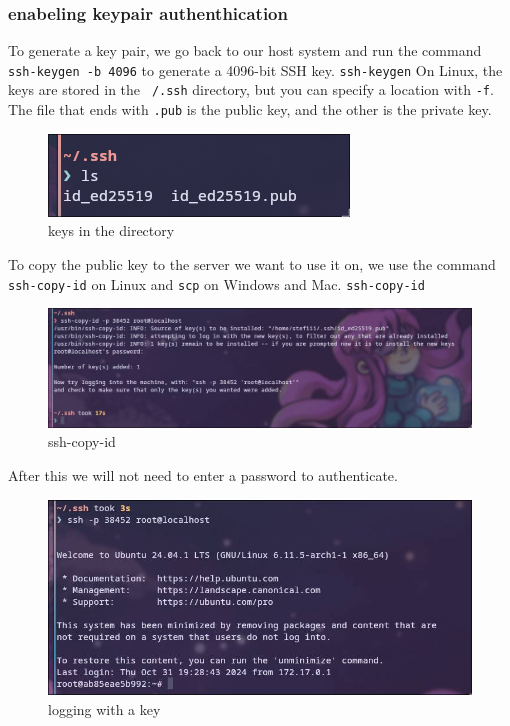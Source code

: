 \documentclass[a4paper]{article}
\newcommand{\abc}{\hfill \break}
\begin{document}
\subsubsection{enabeling keypair authenthication}
To generate a key pair, we go back to our host system and run the command \texttt{ssh-keygen -b 4096} to generate a 4096-bit SSH key. \texttt{ssh-keygen}
On Linux, the keys are stored in the \texttt{~/.ssh} directory, but you can specify a location with \texttt{-f}. The file that ends with \texttt{.pub} is the public key, and the other is the private key.
\begin{figure}[h]
	\centering
	\includegraphics[scale=0.5]{images/keys-in-the-dir.png}
	\caption{keys in the directory}
\end{figure} \abc
To copy the public key to the server we want to use it on, we use the command \texttt{ssh-copy-id} on Linux and \texttt{scp} on Windows and Mac. \texttt{ssh-copy-id}
\begin{figure}[h]
	\centering
	\includegraphics[scale=0.3]{images/ssh-copy-id.png}
	\caption{ssh-copy-id}
\end{figure} \abc
After this we will not need to enter a password to authenticate.
\begin{figure}[h]
	\centering
	\includegraphics[scale=0.35]{images/login-with-key.png}
	\caption{logging with a key}
\end{figure} \abc
\newpage
\end{document}

